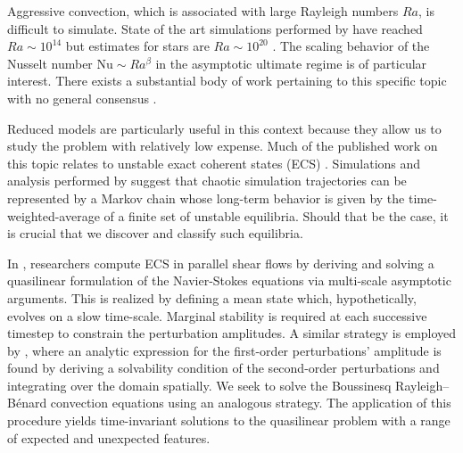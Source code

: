 \documentclass[reprint,amsmath,amssymb,aps]{revtex4-1}
\newcommand\Nu{\mathrm{Nu}}
\begin{document}
Aggressive convection, which is associated with large Rayleigh numbers $Ra$, is difficult to simulate. 
State of the art simulations performed by \cite{Zhu_2018} have reached $Ra \sim 10^{14}$ but estimates for stars are $Ra \sim 10^{20}$ \cite{Ossendrijver}. 
The scaling behavior of the Nusselt number $\Nu \sim Ra^{\beta}$ in the asymptotic ultimate regime is of particular interest.
There exists a substantial body of work pertaining to this specific topic with no general consensus \cite{Malkus_1954, Howard_1966, Kraichnan, Spiegel, Castaing, Grossman, Ahlers}. 

Reduced models are particularly useful in this context because they allow us to study the problem with relatively low expense. 
Much of the published work on this topic relates to unstable exact coherent states (ECS) \cite{Waleffe, Sondak, Wen, chini_cells}. 
Simulations and analysis performed by \cite{Yalniz, Cvitanovic} suggest that chaotic simulation trajectories can be represented by a Markov chain whose long-term behavior is given by the time-weighted-average of a finite set of unstable equilibria. Should that be the case, it is crucial that we discover and classify such equilibria.

In \cite{Beaume_2015}, researchers compute ECS in parallel shear flows by deriving and solving a quasilinear formulation of the Navier-Stokes equations via multi-scale asymptotic arguments. 
This is realized by defining a mean state which, hypothetically, evolves on a slow time-scale. 
Marginal stability is required at each successive timestep to constrain the perturbation amplitudes. 
A similar strategy is employed by \cite{michel_chini_2019}, where an analytic expression for the first-order perturbations' amplitude is found by deriving a solvability condition of the second-order perturbations and integrating over the domain spatially. 
We seek to solve the Boussinesq Rayleigh–Bénard convection equations using an analogous strategy. 
The application of this procedure yields time-invariant solutions to the quasilinear problem with a range of expected and unexpected features. 
\end{document}
